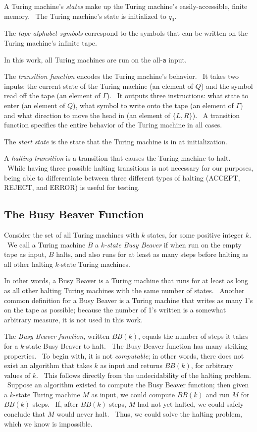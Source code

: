 \documentclass[11pt]{article}
\begin{document}
A Turing machine's \emph{states} make up the Turing machine's easily-accessible, finite memory. \ The Turing machine's state is initialized to $q_0$.

The \emph{tape alphabet symbols} correspond to the symbols that can be written on the Turing machine's infinite tape.

In this work, all Turing machines are run on the all-\texttt{a} input.

The \emph{transition function} encodes the Turing machine's behavior. \ It takes two inputs: the current state of the Turing machine (an element of $Q$) and the symbol read off the tape (an element of $\Gamma$). \ It outputs three instructions: what state to enter (an element of $Q$), what symbol to write onto the tape (an element of $\Gamma$) and what direction to move the head in (an element of $\{L, R\}$). \ A transition function specifies the entire behavior of the Turing machine in all cases.

The \emph{start state} is the state that the Turing machine is in at initialization.

A \emph{halting transition} is a transition that causes the Turing machine to halt. \ While having three possible halting transitions is not necessary for our purposes, being able to differentiate between three different types of halting (ACCEPT, REJECT, and ERROR) is useful for testing.

\subsection{The Busy Beaver Function}

Consider the set of all Turing machines with $k$ states, for some positive integer $k$. \ We call a Turing machine $B$ a $k$\emph{-state Busy Beaver} if when run on the empty tape as input, $B$ halts, and also runs for at least as many steps before halting as all other halting $k$-state Turing machines.~\cite{busybeaver}

In other words, a Busy Beaver is a Turing machine that runs for at least as long as all other halting Turing machines with the same number of states. \ Another common definition for a Busy Beaver is a Turing machine that writes as many 1's on the tape as possible; because the number of 1's written is a somewhat arbitrary measure, it is not used in this work.

The \emph{Busy Beaver function}, written $BB(k)$, equals the number of steps it takes for a $k$-state Busy Beaver to halt. \ The Busy Beaver function has many striking properties. \ To begin with, it is not \emph{computable}; in other words, there does not exist an algorithm that takes $k$ as input and returns $BB(k)$, for arbitrary values of $k$. \ This follows directly from the undecidability of the halting problem. \ Suppose an algorithm existed to compute the Busy Beaver function; then given a $k$-state Turing machine $M$ as input, we could compute $BB(k)$ and run $M$ for $BB(k)$ steps. \ If, after $BB(k)$ steps, $M$ had not yet halted, we could safely conclude that $M$ would never halt. \ Thus, we could solve the halting problem, which we know is impossible.
\end{document}
